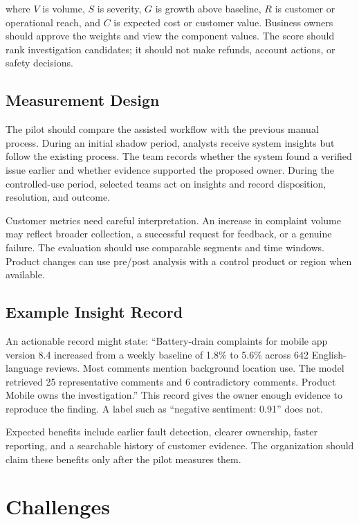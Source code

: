 \documentclass[11pt,a4paper,twoside]{article}
\begin{document}
where \(V\) is volume, \(S\) is severity, \(G\) is growth above baseline, \(R\) is customer or operational reach, and \(C\) is expected cost or customer value. Business owners should approve the weights and view the component values. The score should rank investigation candidates; it should not make refunds, account actions, or safety decisions.

\subsection{Measurement Design}

The pilot should compare the assisted workflow with the previous manual process. During an initial shadow period, analysts receive system insights but follow the existing process. The team records whether the system found a verified issue earlier and whether evidence supported the proposed owner. During the controlled-use period, selected teams act on insights and record disposition, resolution, and outcome.

Customer metrics need careful interpretation. An increase in complaint volume may reflect broader collection, a successful request for feedback, or a genuine failure. The evaluation should use comparable segments and time windows. Product changes can use pre/post analysis with a control product or region when available.

\subsection{Example Insight Record}

An actionable record might state: ``Battery-drain complaints for mobile app version 8.4 increased from a weekly baseline of 1.8\% to 5.6\% across 642 English-language reviews. Most comments mention background location use. The model retrieved 25 representative comments and 6 contradictory comments. Product Mobile owns the investigation.'' This record gives the owner enough evidence to reproduce the finding. A label such as ``negative sentiment: 0.91'' does not.

Expected benefits include earlier fault detection, clearer ownership, faster reporting, and a searchable history of customer evidence. The organization should claim these benefits only after the pilot measures them.

\newpage

\section{Challenges}
\end{document}
